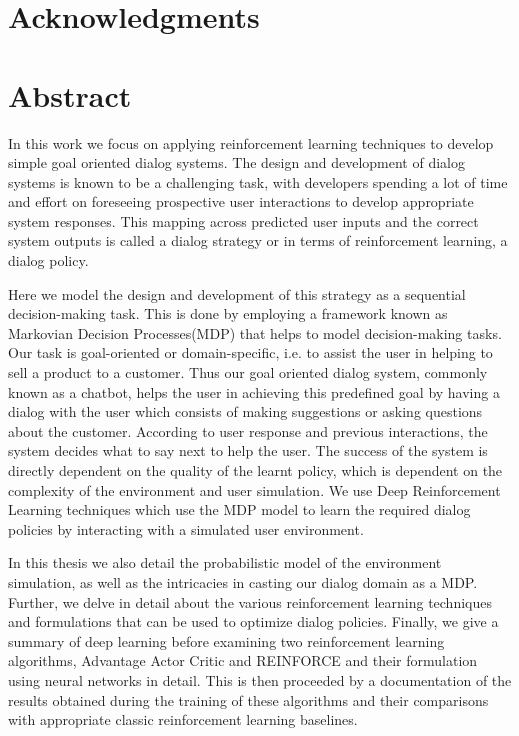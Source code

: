 \documentclass[14pt]{extarticle}
\numberwithin{equation}{section}
\begin{document}
\section*{Acknowledgments}
\clearpage
	
\section*{Abstract}
	In this work we focus on applying reinforcement learning techniques to develop simple goal oriented dialog systems. The design and development of dialog systems is known to be a challenging task, with developers spending a lot of time and effort on foreseeing prospective user interactions to develop appropriate system responses. This mapping across predicted user inputs and the correct system outputs is called a dialog strategy or in terms of reinforcement learning, a dialog policy.
	
	 Here we model the design and development of this strategy as a sequential decision-making task. This is done by employing a framework known as Markovian Decision Processes(MDP) that helps to model decision-making tasks. Our task is goal-oriented or domain-specific, i.e. to assist the user in helping to sell a product to a customer. Thus our goal oriented dialog system, commonly known as a chatbot, helps the user in achieving this predefined goal by having a dialog with the user which consists of making suggestions or asking questions about the customer. According to user response and previous interactions, the system decides what to say next to help the user. The success of the system is directly dependent on the quality of the learnt policy, which is dependent on the complexity of the environment and user simulation. We use Deep Reinforcement Learning techniques which use the MDP model to learn the required dialog policies by interacting with a simulated user environment. 
	 
	 In this thesis we also detail the probabilistic model of the environment simulation, as well as the intricacies in casting our dialog domain as a MDP. Further, we delve in detail about the various reinforcement learning techniques and formulations that can be used to optimize dialog policies. Finally, we give a summary of deep learning before examining two reinforcement learning algorithms, Advantage Actor Critic and REINFORCE and their formulation using neural networks in detail. This is then proceeded by a documentation of the results obtained during the training of these algorithms and their comparisons with appropriate classic reinforcement learning baselines. 
\clearpage
	\tableofcontents
\end{document}
